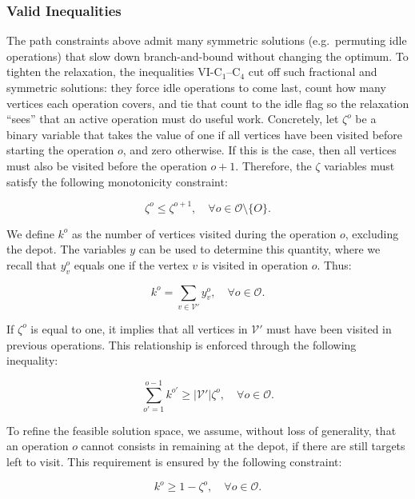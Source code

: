 \documentclass[12pt]{elsarticle}
\begin{document}
\subsubsection*{Valid Inequalities}
The path constraints above admit many symmetric solutions (e.g.\ permuting idle operations) that slow down branch-and-bound without changing the optimum. To tighten the relaxation, the inequalities VI-C$_1$--C$_4$ cut off such fractional and symmetric solutions: they force idle operations to come last, count how many vertices each operation covers, and tie that count to the idle flag so the relaxation ``sees'' that an active operation must do useful work. Concretely, let $\zeta^o$ be a binary variable that takes the value of one if all vertices have been visited before starting the operation $o$, and zero otherwise. If this is the case, then all vertices must also be visited before the operation $o+1$. Therefore, the $\zeta$ variables must satisfy the following monotonicity constraint:

\begin{equation}\label{eq:mon}\tag{VI-C$_1$}
\zeta^o\leq \zeta^{o+1},\quad\forall o\in\mathcal O\setminus\{O\}.
\end{equation}

We define $k^o$ as the number of vertices visited during the operation $o$, excluding the depot. The variables $y$ can be used to determine this quantity, where we recall that $y_v^{o}$ equals one if the vertex $v$ is visited in operation $o$. Thus:

\begin{equation}\label{eq:k}\tag{VI-C$_2$}
k^o=\sum_{v\in\mathcal V'} y_{v}^o, \quad\forall o\in\mathcal O.
\end{equation}

If $\zeta^o$ is equal to one, it implies that all vertices in $\mathcal V'$ must have been visited in previous operations. This relationship is enforced through the following inequality:

\begin{equation}\label{eq:VI-1}\tag{VI-C$_3$}
\sum_{o'=1}^{o-1} k^{o'}\geq |\mathcal V'| \zeta^o,\quad\forall o\in\mathcal O.
\end{equation}

To refine the feasible solution space, we assume, without loss of generality, that an operation $o$ cannot consists in remaining at the depot, if there are still targets left to visit. This requirement is ensured by the following constraint:

\begin{equation}\label{eq:VI-2}\tag{VI-C$_4$}
k^o\geq 1-\zeta^o,\quad\forall o\in\mathcal O.
\end{equation}
\end{document}

